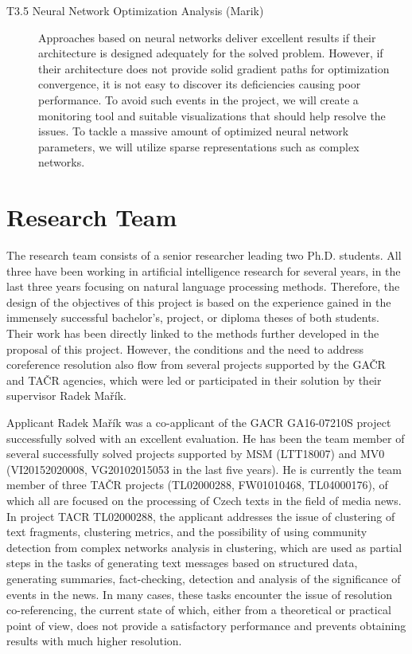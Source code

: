 \begin{description}
	\item [T3.5 Neural Network Optimization Analysis  (Marik)] Approaches based on neural networks deliver excellent results if their architecture is designed adequately for the solved problem. However, if their architecture does not provide solid gradient paths for optimization convergence, it is not easy to discover its deficiencies causing poor performance. To avoid such events in the project, we will create a monitoring tool and suitable visualizations that should help resolve the issues. To tackle a massive amount of optimized neural network parameters, we will utilize sparse representations such as complex networks.

\end{description}


\section{Research Team}\label{sec:research_team}

The research team consists of a senior researcher leading two Ph.D. students. All three have been working in artificial intelligence research for several years, in the last three years focusing on natural language processing methods. Therefore, the design of the objectives of this project is based on the experience gained in the immensely successful bachelor's, project, or diploma theses of both students. Their work has been directly linked to the methods further developed in the proposal of this project. However, the conditions and the need to address coreference resolution also flow from several projects supported by the GAČR and TAČR agencies, which were led or participated in their solution by their supervisor Radek Mařík.

Applicant Radek Mařík was a co-applicant of the GACR GA16-07210S project successfully solved with an excellent evaluation. He has been the team member of several successfully solved projects supported by MSM (LTT18007) and MV0 (VI20152020008, VG20102015053 in the last five years). He is currently the team member of three TAČR projects (TL02000288, FW01010468, TL04000176), of which all are focused on the processing of Czech texts in the field of media news. In project TACR TL02000288, the applicant addresses the issue of clustering of text fragments, clustering metrics, and the possibility of using community detection from complex networks analysis in clustering, which are used as partial steps in the tasks of generating text messages based on structured data, generating summaries, fact-checking, detection and analysis of the significance of events in the news. In many cases, these tasks encounter the issue of resolution co-referencing, the current state of which, either from a theoretical or practical point of view, does not provide a satisfactory performance and prevents obtaining results with much higher resolution.

